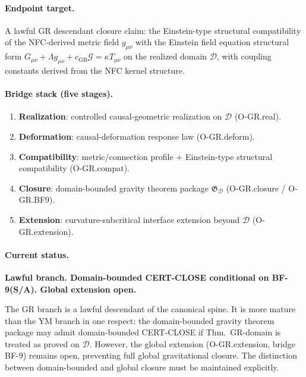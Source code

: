 \documentclass[12pt,oneside]{amsbook}
\theoremstyle{plain}
\theoremstyle{definition}
\theoremstyle{remark}
\begin{document}
\paragraph{Endpoint target.}
A lawful GR descendant closure claim: the Einstein-type structural
compatibility of the NFC-derived metric field $g_{\mu\nu}$ with
the Einstein field equation structural form
$G_{\mu\nu} + \Lambda g_{\mu\nu} + c_{\mathrm{GB}}\mathcal{G}
= \kappa T_{\mu\nu}$ on the realized domain $\mathcal{D}$, with
coupling constants derived from the NFC kernel structure.

\paragraph{Bridge stack (five stages).}
\begin{enumerate}[label=\textup{(\arabic*)}]
 \item \textbf{Realization}: controlled causal-geometric
 realization on $\mathcal{D}$ (O-GR.real).
 \item \textbf{Deformation}: causal-deformation response law
 (O-GR.deform).
 \item \textbf{Compatibility}: metric/connection profile +
 Einstein-type structural compatibility (O-GR.compat).
 \item \textbf{Closure}: domain-bounded gravity theorem package
 $\mathfrak{G}_{\mathcal{D}}$ (O-GR.closure / O-GR.BF9).
 \item \textbf{Extension}: curvature-subcritical interface
 extension beyond $\mathcal{D}$ (O-GR.extension).
\end{enumerate}

\paragraph{Current status.}
\textbf{Lawful branch. Domain-bounded CERT-CLOSE conditional on
BF-9(S/A). Global extension open.}

The GR branch is a lawful descendant of the canonical spine.
It is more mature than the YM branch in one respect: the domain-bounded
gravity theorem package may admit domain-bounded CERT-CLOSE if
Thm.~GR-domain is treated as proved on $\mathcal{D}$. However, the
global extension (O-GR.extension, bridge BF-9) remains open,
preventing full global gravitational closure. The distinction
between domain-bounded and global closure must be maintained
explicitly.

\bigskip

\end{document}
